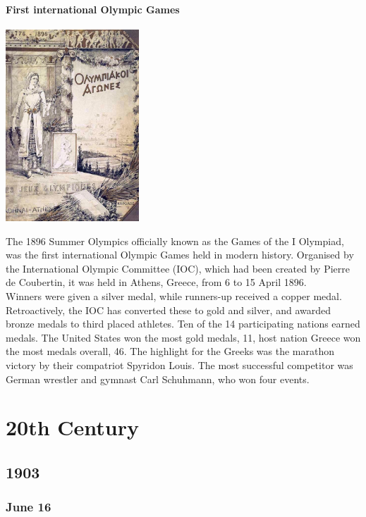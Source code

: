\documentclass[11pt]{report}
\begin{document}
\subsection{First international Olympic Games}
\vspace{2mm}\begin{center}\includegraphics[width=5cm]{./img/olgames.jpg}\end{center}
The 1896 Summer Olympics officially known as the Games of the I Olympiad, was the first international Olympic Games held in modern history. Organised by the International Olympic Committee (IOC), which had been created by Pierre de Coubertin, it was held in Athens, Greece, from 6 to 15 April 1896.\\
Winners were given a silver medal, while runners-up received a copper medal. Retroactively, the IOC has converted these to gold and silver, and awarded bronze medals to third placed athletes. Ten of the 14 participating nations earned medals. The United States won the most gold medals, 11, host nation Greece won the most medals overall, 46. The highlight for the Greeks was the marathon victory by their compatriot Spyridon Louis. The most successful competitor was German wrestler and gymnast Carl Schuhmann, who won four events.

					
\part{20th Century}
\chapter{1903}
\section{June 16}
\end{document}
